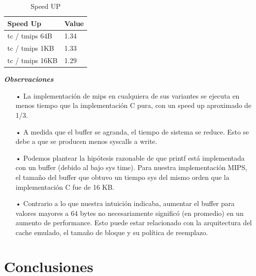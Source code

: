 \documentclass{article}
\begin{document}
\clearpage


\begin{table}[htbp]
\begin{center}
\begin{tabular}{|l|l|}
\hline
Speed Up & Value \\
\hline \hline
tc / tmips 64B & 1.34 \\ \hline
tc / tmips 1KB & 1.33 \\ \hline
tc / tmips 16KB & 1.29 \\ \hline

\end{tabular}
\caption{Speed UP}
\end{center}
\end{table}

\textbf{\textit{Observaciones}}

\begin{itemize}
\item[•] La implementación de mips en cualquiera de sus variantes se ejecuta en menos tiempo que la implementación C pura, con un speed up aproximado de 1/3.\\
\item[•] A medida que el buffer se agranda, el tiempo de sistema se reduce. Esto se debe a que se producen menos syscalls a write.\\
\item[•] Podemos plantear la hipótesis razonable de que printf está implementada con un buffer (debido al bajo sys time). Para nuestra implementación MIPS, el tamaño del buffer que obtuvo un tiempo sys del mismo orden que la implementación C fue de 16 KB.\\
\item[•] Contrario a lo que nuestra intuición indicaba, aumentar el buffer para valores mayores a 64 bytes no necesariamente significó (en promedio) en un aumento de performance. Esto puede estar relacionado con la arquitectura del cache emulado, el tamaño de bloque  y su política de reemplazo.\\
\end{itemize}

\clearpage

\section{Conclusiones}
\end{document}
